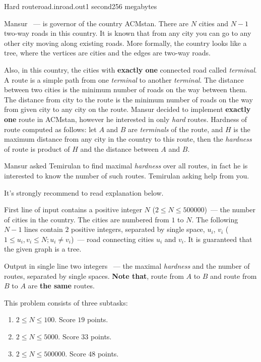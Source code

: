 \begin{problem}{Hard route}{road.in}{road.out}{1 second}{256 megabytes}

Mansur ~--- is governor of the country ACMstan. There are $N$ cities and $N-1$ two-way roads in this country. It is known that from any city you can go to any other city moving along existing roads. More formally, the country looks like a tree, where the vertices are cities and the edges are two-way roads.

Also, in this country, the cities with \textbf{exactly one} connected road called \textit{terminal}. A route is a simple path from one \textit{terminal} to another \textit{terminal}. The distance between two cities is the minimum number of roads on the way between them. The distance from city to the route is the minimum number of roads on the way from given city to any city on the route. Mansur decided to implement \textbf{exactly one} route in ACMstan, however he interested in only \textit{hard} routes. Hardness of route computed as follows: let $A$ and $B$ are \textit{terminals} of the route, and $H$ is the maximum distance from any city in the country to this route, then the \textit{hardness} of route is product of $H$ and the distance between $A$ and $B$.

Mansur asked Temirulan to find maximal \textit{hardness} over all routes, in fact he is interested to know the number of such routes. Temirulan asking help from you.

It's strongly recommend to read explanation below.

\InputFile
First line of input contains a positive integer $N$ ($2 \le N \le 500000$)~--- the number of cities in the country. The cities are numbered from $1$ to $N$. The following $N-1$ lines contain $2$ positive integers, separated by single space, $u_i$, $v_i$ ($1 \le u_i, v_i \le N; u_i \neq v_i$)~--- road connecting cities $u_i$ and $v_i$. It is guaranteed that the given graph is a tree.


\OutputFile
Output in single line two integers ~--- the maximal \textit{hardness} and the number of routes, separated by single spaces. \textbf{Note that}, route from $A$ to $B$ and route from $B$ to $A$ are \textbf{the same} routes.

\Scoring
This problem consists of three subtasks:
\begin{enumerate}
\item $2 \le N \le 100$. Score $19$ points.
\item $2 \le N \le 5000$. Score $33$ points.
\item $2 \le N \le 500000$. Score $48$ points.
\end{enumerate}


\end{problem}

